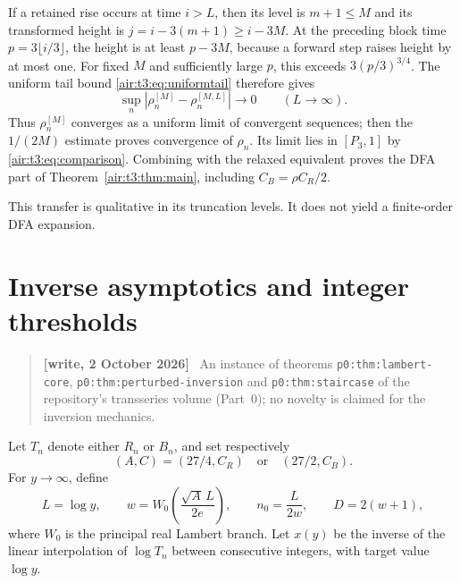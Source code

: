 \documentclass[11pt,letterpaper]{article}
\numberwithin{equation}{section}
\theoremstyle{remark}
\newenvironment{writenote}{\par\smallskip\begin{quote}\small\textbf{[write, 2 October 2026]}\ }{\end{quote}\smallskip}
\newcommand{\repopath}[1]{\nolinkurl{#1}}
\begin{document}
If a retained rise occurs at time $i>L$, then its level is $m+1\le M$ and its transformed height is
$j=i-3(m+1)\ge i-3M$.
At the preceding block time $p=3\lfloor i/3\rfloor$, the height is at least $p-3M$, because a forward step raises height by at most one. For fixed $M$ and sufficiently large $p$, this exceeds $3(p/3)^{3/4}$. The uniform tail bound \eqref{air:t3:eq:uniformtail} therefore gives
\[
\sup_n|\rho_n^{[M]}-\rho_n^{[M,L]}|\longrightarrow0
\qquad(L\to\infty).
\]
Thus $\rho_n^{[M]}$ converges as a uniform limit of convergent sequences; then the $1/(2M)$ estimate proves convergence of $\rho_n$. Its limit lies in $[P_3,1]$ by \eqref{air:t3:eq:comparison}. Combining with the relaxed equivalent proves the DFA part of Theorem~\ref{air:t3:thm:main}, including $C_B=\rho C_R/2$.

This transfer is qualitative in its truncation levels. It does not yield a finite-order DFA expansion.

\section{Inverse asymptotics and integer thresholds}\label{air:t3:sec:inverse}
\begin{writenote}
An instance of theorems \repopath{p0:thm:lambert-core}, \repopath{p0:thm:perturbed-inversion} and \repopath{p0:thm:staircase} of the repository's transseries volume (Part~0); no novelty is claimed for the inversion mechanics.
\end{writenote}

Let $T_n$ denote either $R_n$ or $B_n$, and set respectively
\[
(A,C)=(27/4,C_R)\quad\text{or}\quad(27/2,C_B).
\]
For $y\to\infty$, define
\[
L=\log y,\qquad w=W_0\left(\frac{\sqrt A\,L}{2e}\right),\qquad
n_0=\frac{L}{2w},\qquad D=2(w+1),
\]
where $W_0$ is the principal real Lambert branch. Let $x(y)$ be the inverse of the linear interpolation of $\log T_n$ between consecutive integers, with target value $\log y$.
\end{document}
